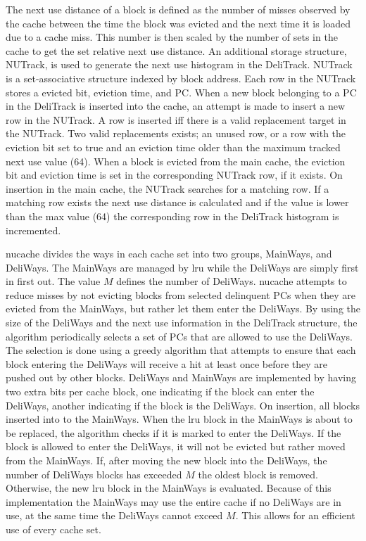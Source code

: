 The next use distance of a block is defined as the number of misses observed by the cache between the time the block was evicted and the next time it is loaded due to a cache miss.
This number is then scaled by the number of sets in the cache to get the set relative next use distance.
An additional storage structure, NUTrack, is used to generate the next use histogram in the DeliTrack.
NUTrack is a set-associative structure indexed by block address.
Each row in the NUTrack stores a evicted bit, eviction time, and PC.
When a new block belonging to a PC in the DeliTrack is inserted into the cache, an attempt is made to insert a new row in the NUTrack. 
A row is inserted iff there is a valid replacement target in the NUTrack.
Two valid replacements exists; an unused row, or a row with the eviction bit set to true and an eviction time older than the maximum tracked next use value (64).
When a block is evicted from the main cache, the eviction bit and eviction time is set in the corresponding NUTrack row, if it exists.
On insertion in the main cache, the NUTrack searches for a matching row. 
If a matching row exists the next use distance is calculated and if the value is lower than the max value (64) the corresponding row in the DeliTrack histogram is incremented.

\gls{nucache} divides the ways in each cache set into two groups, MainWays, and DeliWays.
The MainWays are managed by \gls{lru} while the DeliWays are simply first in first out.
The value $M$ defines the number of DeliWays.
\gls{nucache} attempts to reduce misses by not evicting blocks from selected delinquent PCs when they are evicted from the MainWays, but rather let them enter the DeliWays.
By using the size of the DeliWays and the next use information in the DeliTrack structure, the algorithm periodically selects a set of PCs that are allowed to use the DeliWays.
The selection is done using a greedy algorithm that attempts to ensure that each block entering the DeliWays will receive a hit at least once before they are pushed out by other blocks.
DeliWays and MainWays are implemented by having two extra bits per cache block, one indicating if the block can enter the DeliWays, another indicating if the block is the DeliWays.
On insertion, all blocks inserted into to the MainWays.
When the \gls{lru} block in the MainWays is about to be replaced, the algorithm checks if it is marked to enter the DeliWays.
If the block is allowed to enter the DeliWays, it will not be evicted but rather moved from the MainWays.
If, after moving the new block into the DeliWays, the number of DeliWays blocks has exceeded $M$ the oldest block is removed.
Otherwise, the new \gls{lru} block in the MainWays is evaluated.
Because of this implementation the MainWays may use the entire cache if no DeliWays are in use, at the same time the DeliWays cannot exceed $M$.
This allows for an efficient use of every cache set.

